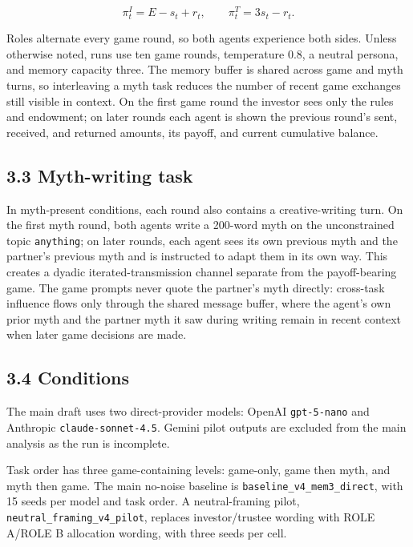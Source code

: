 \documentclass[10pt,letterpaper]{article}
\begin{document}
\[
\pi^I_t = E - s_t + r_t,\qquad \pi^T_t = 3s_t - r_t.
\]

Roles alternate every game round, so both agents experience both sides.
Unless otherwise noted, runs use ten game rounds, temperature 0.8, a
neutral persona, and memory capacity three. The memory buffer is shared
across game and myth turns, so interleaving a myth task reduces the
number of recent game exchanges still visible in context. On the first
game round the investor sees only the rules and endowment; on later
rounds each agent is shown the previous round's sent, received, and
returned amounts, its payoff, and current cumulative balance.

\subsection{3.3 Myth-writing task}\label{myth-writing-task}

In myth-present conditions, each round also contains a creative-writing
turn. On the first myth round, both agents write a 200-word myth on the
unconstrained topic \texttt{anything}; on later rounds, each agent sees
its own previous myth and the partner's previous myth and is instructed
to adapt them in its own way. This creates a dyadic
iterated-transmission channel separate from the payoff-bearing game. The
game prompts never quote the partner's myth directly: cross-task
influence flows only through the shared message buffer, where the
agent's own prior myth and the partner myth it saw during writing remain
in recent context when later game decisions are made.

\subsection{3.4 Conditions}\label{conditions}

The main draft uses two direct-provider models: OpenAI
\texttt{gpt-5-nano} and Anthropic \texttt{claude-sonnet-4.5}. Gemini
pilot outputs are excluded from the main analysis as the run is
incomplete.

Task order has three game-containing levels: game-only, game then myth,
and myth then game. The main no-noise baseline is
\texttt{baseline\_v4\_mem3\_direct}, with 15 seeds per model and task
order. A neutral-framing pilot, \texttt{neutral\_framing\_v4\_pilot},
replaces investor/trustee wording with ROLE A/ROLE B allocation wording,
with three seeds per cell.
\end{document}
